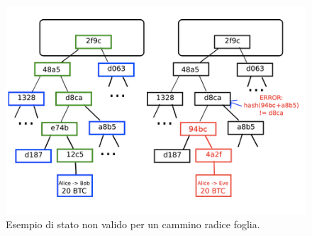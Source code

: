 \begin{figure}[H]
\begin{center}
\includegraphics[width=0.6\columnwidth]{images/image-merkle-treepng.png}
\end{center}
\caption{Esempio di stato non valido per un cammino radice foglia. \cite{ethereum:paper}}
\label{fig:merkletree}
\end{figure}
